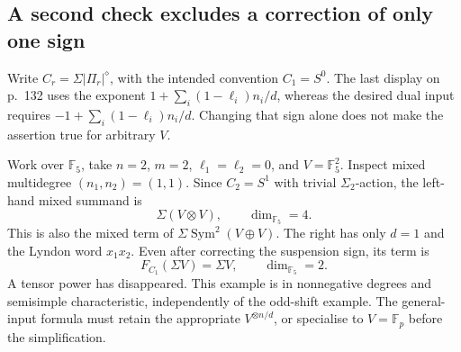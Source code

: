 \documentclass[10pt]{article}
\begin{document}
\subsection*{A second check excludes a correction of only one sign}
Write \(C_r=\Sigma|\Pi_r|^\diamond\), with the intended convention \(C_1=S^0\). The last display on p. 132 uses the exponent \(1+\sum_i(1-\ell_i)n_i/d\), whereas the desired dual input requires \(-1+\sum_i(1-\ell_i)n_i/d\). Changing that sign alone does not make the assertion true for arbitrary \(V\).\par
Work over \(\mathbb F_5\), take \(n=2\), \(m=2\), \(\ell_1=\ell_2=0\), and \(V=\mathbb F_5^2\). Inspect mixed multidegree \((n_1,n_2)=(1,1)\). Since \(C_2=S^1\) with trivial \(\Sigma_2\)-action, the left-hand mixed summand is \[\Sigma(V\otimes V),\qquad \dim_{\mathbb F_5}=4.\] This is also the mixed term of \(\Sigma\operatorname{Sym}^2(V\oplus V)\). The right has only \(d=1\) and the Lyndon word \(x_1x_2\). Even after correcting the suspension sign, its term is \[F_{C_1}(\Sigma V)=\Sigma V,\qquad \dim_{\mathbb F_5}=2.\] A tensor power has disappeared. This example is in nonnegative degrees and semisimple characteristic, independently of the odd-shift example. The general-input formula must retain the appropriate \(V^{\otimes n/d}\), or specialise to \(V=\mathbb F_p\) before the simplification.\par
\end{document}
